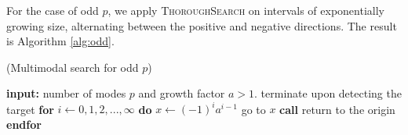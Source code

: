 For the case of odd $p$, we apply \textsc{ThoroughSearch} on intervals of exponentially growing size, alternating between the positive and negative directions. The result is Algorithm \ref{alg:odd}.
\begin{algorithm}[H]
  \caption{(Multimodal search for odd $p$)}
  \begin{algorithmic}[1]
      \State \textbf{input:} number of modes $p$ and growth factor $a>1$.
      \State terminate upon detecting the target
      \State \textbf{for} $i \gets 0,1,2, ..., \infty$ \textbf{do}   \Indent
      \State $x \gets (-1)^ia^{i-1}$
      \State go to $x$
      \State \textbf{call} 
      \State return to the origin \EndIndent
      \State \textbf{endfor}
  \end{algorithmic}
\end{algorithm}

